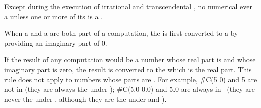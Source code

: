 
Except during the execution of irrational and transcendental ,
no numerical  ever  a  unless 
one or more of its  is a .

\endsubsubsection%


When a 
and 
a  are both part of a computation, 
the 
is first converted to a  by providing an imaginary part of \f{0}.
\endsubsubsection%


If the result of any computation would be a 
number whose real part is  and whose imaginary
part is zero, the result is converted to the  
which is the real part.
This rule does not apply to  numbers whose parts
are . 
For example, \f{\#C(5 0)} and \f{5} are not   in \clisp
(they are always the  under );
\f{\#C(5.0 0.0)} and \f{5.0} are always   in \clisp\
(they are never the  under ,
although they are the \term{same} under  and \funref{=}).

